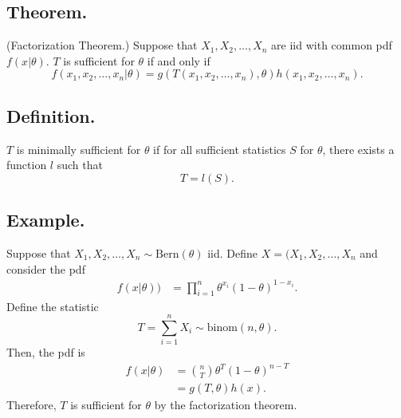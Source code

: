 \documentclass[titlepage]{article}
\begin{document}
\subsection{Theorem.} (Factorization Theorem.) Suppose that $X_{1}, X_{2}, \ldots, X_{n}$ are iid with common pdf $f(x|\theta)$. $T$ is sufficient for $\theta$ if and only if 
$$f(x_{1}, x_{2}, \ldots, x_{n}|\theta) = g(T(x_{1}, x_{2}, \ldots, x_{n}), \theta)h(x_{1}, x_{2}, \ldots, x_{n}).$$

\subsection{Definition.} $T$ is minimally sufficient for $\theta$ if for all sufficient statistics $S$ for $\theta$, there exists a function $l$ such that 
$$T = l(S).$$

\subsection{Example.} Suppose that $X_{1}, X_{2}, \ldots, X_{n} \sim \text{Bern}(\theta)$ iid. Define $X = (X_{1}, X_{2}, \ldots, X_{n}$ and consider the pdf 
\begin{align*}
    f(x|\theta)) &= \prod_{i=1}^{n}\theta^{x_{i}}(1-\theta)^{1-x_{i}}.
\end{align*}
Define the statistic
$$T = \sum_{i=1}^{n}X_{i} \sim \text{binom}(n, \theta).$$
Then, the pdf is 
\begin{align*}
    f(x|\theta) &= \binom{n}{T}\theta^{T}(1-\theta)^{n-T} \\
                &= g(T, \theta)h(x).
\end{align*}
Therefore, $T$ is sufficient for $\theta$ by the factorization theorem.
\end{document}
